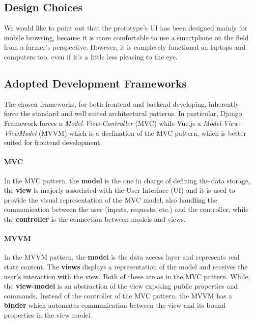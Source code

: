 \documentclass[table, 12pt]{article}
\begin{document}
\subsection{Design Choices}
We would like to point out that the prototype's UI has been designed mainly for mobile browsing, because it is more comfortable to use a smartphone on the field from a farmer's perspective. However, it is completely functional on laptops and computers too, even if it's a little less pleasing to the eye.

\subsection{Adopted Development Frameworks}
The chosen frameworks, for both frontend and backend developing, inherently force the standard and well suited architectural patterns. In particular, Django Framework forces a \emph{Model-View-Controller} (MVC) while Vue.js a \emph{Model-View-ViewModel} (MVVM) which is a declination of the MVC pattern, which is better suited for frontend development. 

\paragraph{MVC} In the MVC pattern, the \textbf{model} is the one in charge of defining the data storage, the \textbf{view} is majorly associated with the User Interface (UI) and it is used to provide the visual representation of the MVC model, also handling the communication between the user (inputs, requests, etc.) and the controller, while the \textbf{controller} is the connection between models and views.

\paragraph{MVVM} In the MVVM pattern, the \textbf{model} is the data access layer and represents real state content. The \textbf{views} displays a representation of the model and receives the user's interaction with the view. Both of these are as in the MVC pattern. While, the \textbf{view-model} is an abstraction of the view exposing public properties and commands. Instead of the controller of the MVC pattern, the MVVM has a \textbf{binder} which automates communication between the view and its bound properties in the view model.
\end{document}
